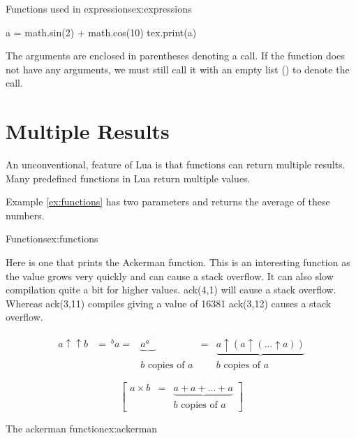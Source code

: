 \begin{texexample}{Functions used in expressions}{ex:expressions}
\begin{luacode}
  a = math.sin(2) + math.cos(10)
  tex.print(a)
\end{luacode}
\end{texexample}

The arguments are enclosed in parentheses denoting a call. If the function does not have any arguments, we must still call it with an empty list () to denote the call.

\section{Multiple Results}

An unconventional, feature of Lua is that functions can return multiple results. Many predefined functions in Lua return multiple values. 

Example \ref{ex:functions} has two parameters and returns the average of these numbers.

\begin{texexample}{Functions}{ex:functions}
\end{texexample}

Here is one that prints the Ackerman function. This is an interesting function as the value grows very quickly and can cause a stack overflow. It can also slow compilation quite a bit for higher values. ack(4,1) will cause a stack overflow. Whereas ack(3,11) compiles giving a value of 16381 ack(3,12) causes a stack overflow.  

\[
\begin{matrix}
   a\uparrow\uparrow b & = {\ ^{b}a}  = & \underbrace{a^{a^{{}^{.\,^{.\,^{.\,^a}}}}}} & 
   = & \underbrace{a\uparrow (a\uparrow(\dots\uparrow a))} 
\\  
    & & b\mbox{ copies of }a
    & & b\mbox{ copies of }a
  \end{matrix}
\]

\[
\begin{bmatrix}
   a\times b & = & \underbrace{a+a+\dots+a} \\
   & & b\mbox{ copies of }a
\end{bmatrix} 
\]


\begin{texexample}{The ackerman function}{ex:ackerman}
\end{texexample}



